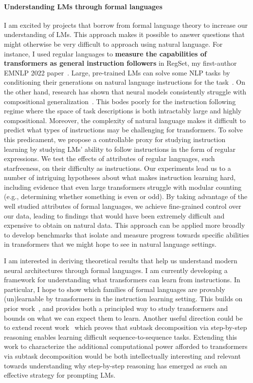 \documentclass[11pt]{article}
\begin{document}
\paragraph{Understanding LMs through formal languages}

I am excited by projects 
that borrow from formal language theory
to increase our understanding of LMs.
This approach makes it possible to answer 
questions that might otherwise be very difficult to approach using natural language.
For instance, I used regular languages to 
\textbf{measure the capabilities of transformers as general instruction followers}
in RegSet, my first-author EMNLP 2022 paper~\cite{Finlayson2022WhatMI}. 
Large, pre-trained LMs can solve some NLP tasks 
by conditioning their generations on natural language instructions 
for the task~\cite{mishra2021crosstask, Wei2021FinetunedLM}. 
On the other hand, 
research has shown that neural models consistently struggle with
compositional generalization~\cite{Lake2018GeneralizationWS}. 
This bodes poorly for the instruction following regime
where the space of task descriptions is both intractably large 
and highly compositional.
Moreover, the complexity of natural language makes it difficult to
predict what types of instructions may be challenging for transformers.
To solve this predicament, 
we propose a controllable proxy for studying instruction learning
by studying LMs' ability to follow instructions in the form of regular expressions.
We test the effects of attributes of regular languages,
such starfreeness, on their difficulty as instructions.
Our experiments lead us to a number of intriguing hypotheses 
about what makes instruction learning hard, 
including evidence that even large transformers struggle with modular counting 
(e.g., determining whether something is even or odd). 
By taking advantage of the well studied attributes of formal languages,
we achieve fine-grained control over our data, leading to findings that
would have been extremely difficult and expensive to obtain on natural data.
This approach can be applied more broadly to develop benchmarks 
that isolate and measure progress towards specific abilities 
in transformers that we might hope to see in natural language settings.

I am interested 
in deriving theoretical results 
that help us understand modern neural architectures 
through formal languages.
I am currently developing a framework for 
understanding what transformers can learn from instructions. 
In particular, I hope to show which families of formal languages 
are provably (un)learnable by transformers 
in the instruction learning setting.
This builds on prior work~\cite{Merrill2022LogPrecisionTA},
and provides both a principled way to study transformers 
and bounds on what we can expect them to learn.
Another useful direction could be to extend
recent work~\cite{Wies2022SubTaskDE} which 
proves that subtask decomposition
via step-by-step reasoning
enables learning difficult sequence-to-sequence tasks.
Extending this work 
to characterize the additional computational power 
afforded to transformers via subtask decomposition
would be both intellectually interesting
and relevant towards understanding why step-by-step reasoning 
has emerged as such an effective strategy for prompting LMs.
\end{document}
